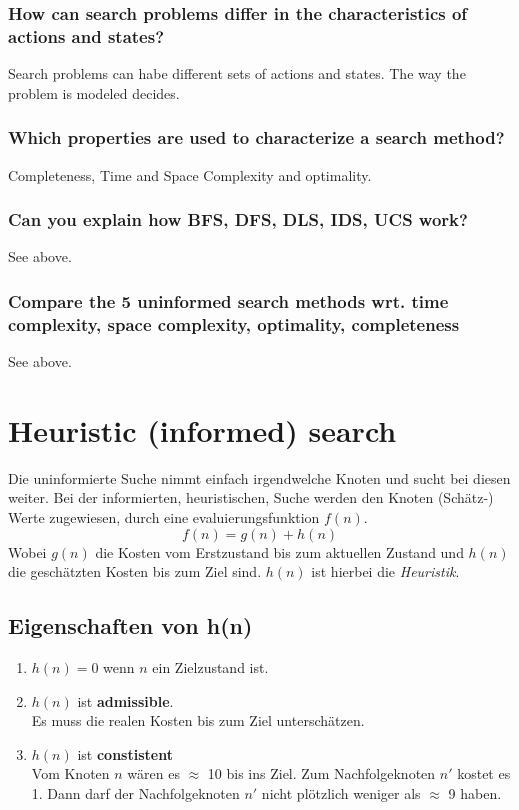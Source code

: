 \subsubsection{How can search problems differ in the characteristics of actions and states?}
Search problems can habe different sets of actions and states. The way the problem is modeled decides.
\subsubsection{Which properties are used to characterize a search method?}
Completeness, Time and Space Complexity and optimality.
\subsubsection{Can you explain how BFS, DFS, DLS, IDS, UCS work?}
See above.
\subsubsection{Compare the 5 uninformed search methods wrt. time complexity, space complexity, optimality, completeness}
See above.

\section{Heuristic (informed) search}
Die uninformierte Suche nimmt einfach irgendwelche Knoten und sucht bei diesen weiter. Bei der informierten, heuristischen, Suche werden den Knoten (Schätz-) Werte zugewiesen, durch eine evaluierungsfunktion \(f(n)\).
\begin{displaymath}
f(n) = g(n) + h(n)
\end{displaymath}
Wobei \(g(n)\) die Kosten vom Erstzustand bis zum aktuellen Zustand und \(h(n)\) die geschätzten Kosten bis zum Ziel sind. \(h(n)\) ist hierbei die \textit{Heuristik}.

\subsection{Eigenschaften von h(n)}\label{sec:heuristic_properties}
\begin{enumerate}
	\item \(h(n) = 0\) wenn \(n\) ein Zielzustand ist.
	\item \(h(n)\) ist \textbf{admissible}. \\
		Es muss die realen Kosten bis zum Ziel unterschätzen.
	\item \(h(n)\) ist \textbf{constistent}\\
		Vom Knoten \(n\) wären es \(\approx\) 10 bis ins Ziel. Zum Nachfolgeknoten \(n'\) kostet es 1. Dann darf der Nachfolgeknoten \(n'\) nicht plötzlich  weniger als \(\approx\) 9 haben.
\end{enumerate}

